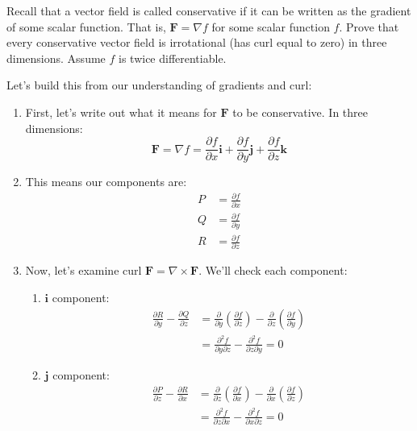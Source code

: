 \exampleline
\begin{example} 
Recall that a vector field is called conservative if it can be written as the gradient of some scalar function. That is, $\mathbf{F} = \nabla f$ for some scalar function $f$. Prove that every conservative vector field is irrotational (has curl equal to zero) in three dimensions. Assume $f$ is twice differentiable.

\begin{solution}
Let's build this from our understanding of gradients and curl:

\begin{enumerate}
\item First, let's write out what it means for $\mathbf{F}$ to be conservative. In three dimensions:
\[
\mathbf{F} = \nabla f = \frac{\partial f}{\partial x}\mathbf{i} + \frac{\partial f}{\partial y}\mathbf{j} + \frac{\partial f}{\partial z}\mathbf{k}
\]

\item This means our components are:
\begin{align*}
P &= \frac{\partial f}{\partial x} \\
Q &= \frac{\partial f}{\partial y} \\
R &= \frac{\partial f}{\partial z}
\end{align*}

\item Now, let's examine curl $\mathbf{F} = \nabla \times \mathbf{F}$. We'll check each component:

\begin{enumerate}
\item $\mathbf{i}$ component:
\begin{align*}
\frac{\partial R}{\partial y} - \frac{\partial Q}{\partial z} 
&= \frac{\partial}{\partial y}\left(\frac{\partial f}{\partial z}\right) - \frac{\partial}{\partial z}\left(\frac{\partial f}{\partial y}\right) \\
&= \frac{\partial^2 f}{\partial y\partial z} - \frac{\partial^2 f}{\partial z\partial y} = 0
\end{align*}

\item $\mathbf{j}$ component:
\begin{align*}
\frac{\partial P}{\partial z} - \frac{\partial R}{\partial x} 
&= \frac{\partial}{\partial z}\left(\frac{\partial f}{\partial x}\right) - \frac{\partial}{\partial x}\left(\frac{\partial f}{\partial z}\right) \\
&= \frac{\partial^2 f}{\partial z\partial x} - \frac{\partial^2 f}{\partial x\partial z} = 0
\end{align*}


\end{enumerate}
\end{enumerate}
\end{solution}
\end{example}
